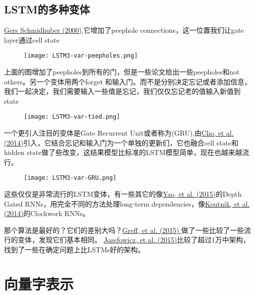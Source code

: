 \subsection{LSTM的多种变体}
\href{ftp://ftp.idsia.ch/pub/juergen/TimeCount-IJCNN2000.pdf}{Gers  Schmidhuber (2000)},它增加了peephole connections，这一位置我们让gate layer通过cell state
\begin{figure}
\centering
\texttt{[image: LSTM3-var-peepholes.png]}
\end{figure}
上面的图增加了peepholes到所有的门，但是一些论文给出一些peepholes和not others。另一个变体用两个forget 和输入门。而不是分别决定忘记或者添加信息，我们一起决定，我们需要输入一些值是忘记，我们仅仅忘记老的值输入新值到state
\begin{figure}
\centering
\texttt{[image: LSTM3-var-tied.png]}
\end{figure}
一个更引人注目的变体是Gate Recurrent Unit或者称为(GRU),由\href{http://arxiv.org/pdf/1406.1078v3.pdf}{Cho, et al. (2014)}引入，它结合忘记和输入门为一个单独的更新们，它也融合cell state和hidden state做了些改变，这结果模型比标准的LSTM模型简单，现在也越来越流行。
\begin{figure}
\centering
\texttt{[image: LSTM3-var-GRU.png]}
\end{figure}
这些仅仅是非常流行的LSTM变体，有一些其它的像\href{http://arxiv.org/pdf/1508.03790v2.pdf}{Yao, et al. (2015)}的Depth Gated RNNs，用完全不同的方法处理long-term dependencies，像\href{http://arxiv.org/pdf/1402.3511v1.pdf}{Koutnik, et al. (2014)}的Clockwork RNNs。\par
那个算法是最好的？它们的差别大吗？\href{http://arxiv.org/pdf/1503.04069.pdf}{Greff, et al. (2015) }做了一些比较了一些流行的变体，发现它们基本相同。
\href{http://jmlr.org/proceedings/papers/v37/jozefowicz15.pdf}{Jozefowicz, et al. (2015)}比较了超过1万中架构，找到了一些在确定问题上比LSTMs好的架构。
\section{向量字表示}
